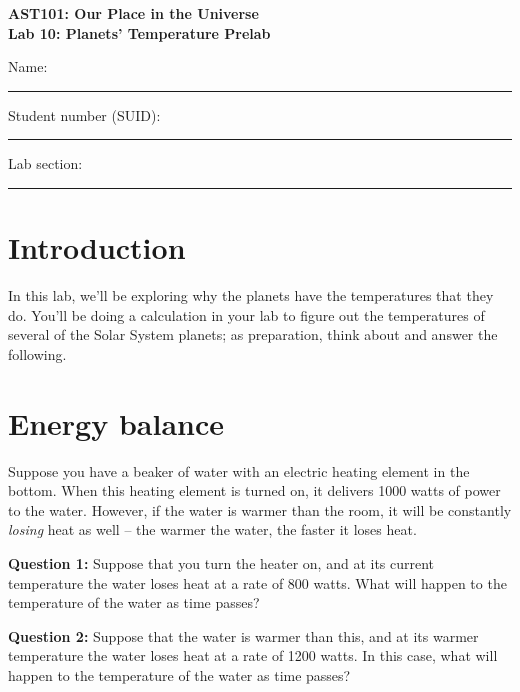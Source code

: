 \documentclass[11pt]{article}
\begin{document}
\begin{center}
\textbf{\Large
AST101: Our Place in the Universe \\
\vspace*{0.1cm}
Lab 10: Planets' Temperature Prelab 
}
\end{center}

\vspace*{0.5cm}

{\Large Name:}\vspace*{0.5cm}\\\hrule
{\Large Student number (SUID):}\vspace*{0.5cm}\\\hrule
{\Large Lab section:}\vspace*{0.5cm}\\\hrule
\vspace*{0.5cm}

\section{Introduction}

In this lab, we'll be exploring why the planets have the temperatures that they do. You'll be doing a calculation in your 
lab to figure out the temperatures of several of the Solar System planets; as preparation, think about and answer the 
following.

\section{Energy balance}

Suppose you have a beaker of water with an electric heating element in the bottom. When this heating element is turned on, it delivers
1000 watts of power to the water. However, if the water is warmer than the room, it will be constantly
{\it losing} heat as well -- the warmer the water, the faster it loses heat.

{\bf Question 1:} Suppose that you turn the heater on, and at its current temperature the water loses heat at a rate of 
800 watts. What will happen to the temperature of the water as time passes?

\vspace{1in}

{\bf Question 2:} Suppose that the water is warmer than this, and at its warmer temperature the water loses heat at a rate
of 1200 watts. In this case, what will happen to the temperature of the water as time passes?
\end{document}
